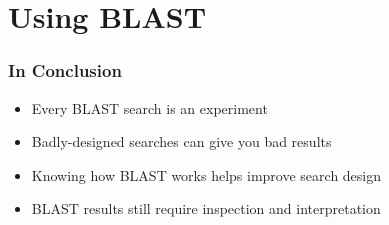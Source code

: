 \section{Using BLAST}
  
  
  
  

\begin{frame}
  \frametitle{In Conclusion}
  \begin{itemize}
    \item Every BLAST search is an experiment
    \item Badly-designed searches can give you bad results
    \item Knowing how BLAST works helps improve search design
    \item BLAST results still require inspection and interpretation
  \end{itemize}
\end{frame}     
    

